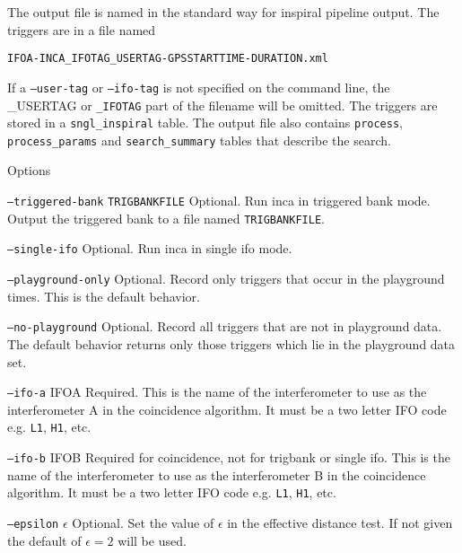 \begin{entry}
The output file is named in the standard way for inspiral pipeline output.
The triggers are in a file named\\
\begin{center}
\texttt{IFOA-INCA\_IFOTAG\_USERTAG-GPSSTARTTIME-DURATION.xml}\\
\end{center}

If a \texttt{--user-tag} or \texttt{--ifo-tag} is not specified on the
command line, the \textsc{\_USERTAG} or \texttt{\_IFOTAG} part of the
filename will be omitted.  The triggers are stored in a
\texttt{sngl\_inspiral} table.  The output file also contains
\texttt{process}, \texttt{process\_params} and \texttt{search\_summary}
tables that describe the search.

\item[Options]\leavevmode
\begin{entry}

\item[\texttt{--triggered-bank} \texttt{TRIGBANKFILE}] Optional.  Run
inca in triggered bank mode.  Output the triggered bank to a file named
\texttt{TRIGBANKFILE}.

\item[\texttt{--single-ifo}] Optional.  Run inca in single ifo mode.

\item[\texttt{--playground-only}] Optional.  Record only triggers that
occur in the playground times.  This is the default behavior.

\item[\texttt{--no-playground}] Optional.  Record all triggers that are
not in playground data.  The default behavior returns only those triggers
which lie in the playground data set.  

\item[\texttt{--ifo-a} \textsc{IFOA}] Required. This is the name of the
interferometer to use as the interferometer A in the coincidence algorithm.
It must be a two letter IFO code e.g. \texttt{L1}, \texttt{H1}, etc.

\item[\texttt{--ifo-b} \textsc{IFOB}] Required for coincidence, not for
trigbank or single ifo. This is the name of the interferometer to use as
the interferometer B in the coincidence algorithm.  It must be a two
letter IFO code e.g. \texttt{L1}, \texttt{H1}, etc.

\item[\texttt{--epsilon} \textsc{$\epsilon$}] Optional. Set the value of
$\epsilon$ in the effective distance test. If not given the default of
$\epsilon = 2$ will be used.


\end{entry}
\end{entry}
